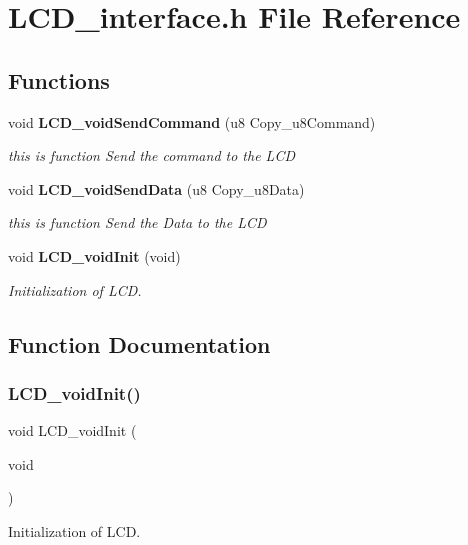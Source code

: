 \section{L\+C\+D\+\_\+interface.\+h File Reference}
\label{_l_c_d__interface_8h}
\subsection*{Functions}
\begin{DoxyCompactItemize}
\item 
void \textbf{ L\+C\+D\+\_\+void\+Send\+Command} (u8 Copy\+\_\+u8\+Command)
\begin{DoxyCompactList}\small\item\em this is function Send the command to the L\+CD \end{DoxyCompactList}\item 
void \textbf{ L\+C\+D\+\_\+void\+Send\+Data} (u8 Copy\+\_\+u8\+Data)
\begin{DoxyCompactList}\small\item\em this is function Send the Data to the L\+CD \end{DoxyCompactList}\item 
void \textbf{ L\+C\+D\+\_\+void\+Init} (void)
\begin{DoxyCompactList}\small\item\em Initialization of L\+CD. \end{DoxyCompactList}\end{DoxyCompactItemize}


\subsection{Function Documentation}
\mbox{\label{_l_c_d__interface_8h_a9939aa0ac8f65ebd9ad2b3eb608ba925}} 
\subsubsection{LCD\_voidInit()}
{\footnotesize\ttfamily void L\+C\+D\+\_\+void\+Init (\begin{DoxyParamCaption}\item[{void}]{ }\end{DoxyParamCaption})}



Initialization of L\+CD. 

